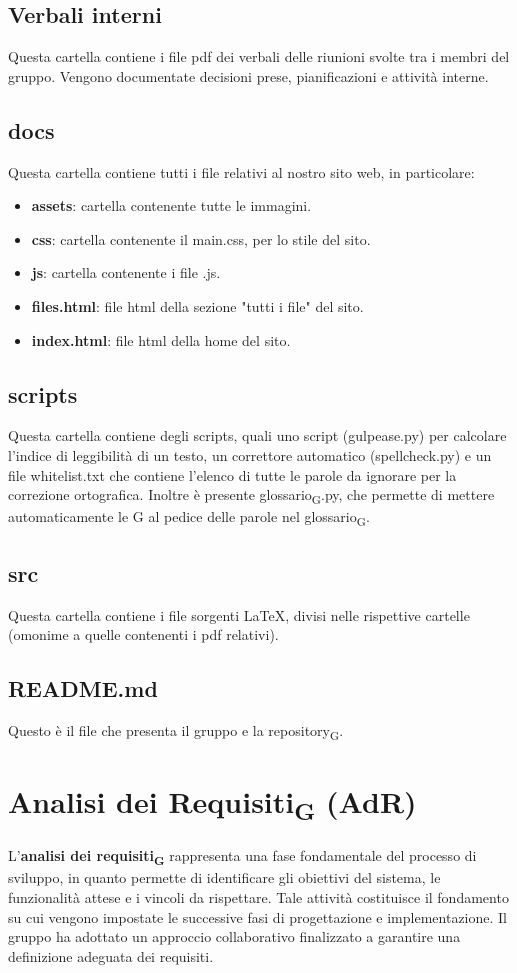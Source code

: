 \documentclass[11pt,a4paper]{article}
\newcommand{\gls}[1]{#1\textsubscript{G}}
\begin{document}
\subsection{Verbali interni}
Questa cartella contiene i file pdf dei verbali delle riunioni svolte tra i membri del gruppo. Vengono documentate decisioni prese, pianificazioni e attività interne.

\subsection{docs}
Questa cartella contiene tutti i file relativi al nostro sito web, in particolare:
\begin{itemize}
\item \textbf{assets}: cartella contenente tutte le immagini.
\item \textbf{css}: cartella contenente il main.css, per lo stile del sito.
\item \textbf{js}: cartella contenente i file .js.
\item \textbf{files.html}: file html della sezione "tutti i file" del sito.
\item \textbf{index.html}: file html della home del sito.
\end{itemize}

\subsection{scripts}
Questa cartella contiene degli scripts, quali uno script (gulpease.py) per calcolare l'indice di leggibilità di un testo, un correttore automatico (spellcheck.py) e un file whitelist.txt che contiene l'elenco di tutte le parole da ignorare per la correzione ortografica. Inoltre è presente \gls{glossario}.py, che permette di mettere automaticamente le G al pedice delle parole nel \gls{glossario}.
\subsection{src}
Questa cartella contiene i file sorgenti LaTeX, divisi nelle rispettive cartelle (omonime a quelle contenenti i pdf relativi).

\subsection{README.md}
Questo è il file che presenta il gruppo e la \gls{repository}.

\newpage

\section{\gls{Analisi dei Requisiti} (AdR)}
L’\textbf{\gls{analisi dei requisiti}} rappresenta una fase fondamentale del processo di sviluppo, in quanto permette di identificare gli obiettivi del sistema, le funzionalità attese e i vincoli da rispettare. Tale attività costituisce il fondamento su cui vengono impostate le successive fasi di progettazione e implementazione. 
Il gruppo ha adottato un approccio collaborativo finalizzato a garantire una definizione adeguata dei requisiti.
\end{document}
